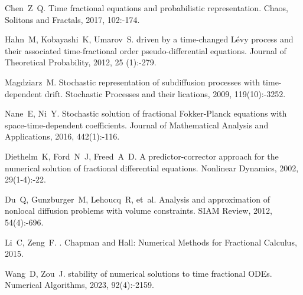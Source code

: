 \begin{thebibliography}{99}
    Chen~Z~Q.
    \newblock Time fractional equations and probabilistic
    representation\allowbreak[J].
    \newblock Chaos, Solitons and Fractals, 2017, 102:-174.
    
    Hahn~M, Kobayashi~K, Umarov~S.
     driven by a time-changed {Lévy} process and their associated
    time-fractional order pseudo-differential equations\allowbreak[J].
    \newblock Journal of Theoretical Probability, 2012, 25\allowbreak
    (1):-279.
    
    Magdziarz~M.
    \newblock Stochastic representation of subdiffusion processes with
    time-dependent drift\allowbreak[J].
    \newblock Stochastic Processes and their lications, 2009{},
    119\allowbreak (10):-3252.
    
    Nane~E, Ni~Y.
    \newblock Stochastic solution of fractional {Fokker-Planck} equations with
    space-time-dependent coefficients\allowbreak[J].
    \newblock Journal of Mathematical Analysis and Applications, 2016,
    442\allowbreak (1):-116.
    
    Diethelm~K, Ford~N~J, Freed~A~D.
    \newblock A predictor-corrector approach for the numerical solution of
    fractional differential equations\allowbreak[J].
    \newblock Nonlinear Dynamics, 2002, 29\allowbreak (1-4):-22.
    
    Du~Q, Gunzburger~M, Lehoucq~R, et~al.
    \newblock Analysis and approximation of nonlocal diffusion problems with volume
    constraints\allowbreak[J].
    \newblock SIAM Review, 2012, 54\allowbreak (4):-696.
    
    Li~C, Zeng~F.
    \allowbreak[M].
    \newblock Chapman and Hall: Numerical Methods for Fractional Calculus, 2015.
    
    Wang~D, Zou~J.
     stability of numerical solutions to time
    fractional {ODEs}\allowbreak[J].
    \newblock Numerical Algorithms, 2023, 92\allowbreak (4):-2159.
    

\end{thebibliography}
